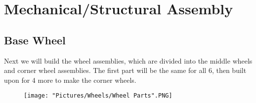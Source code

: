 \documentclass[12pt]{article}
\begin{document}
\section{Mechanical/Structural Assembly}

\subsection{Base Wheel}
Next we will build the wheel assemblies, which are divided into the middle wheels and corner wheel assemblies. The first part will be the same for all 6, then built upon for 4 more to make the corner wheels. 

\begin{figure}[H]
	\centering
	\texttt{[image: "Pictures/Wheels/Wheel Parts".PNG]}
\end{figure}
\end{document}
